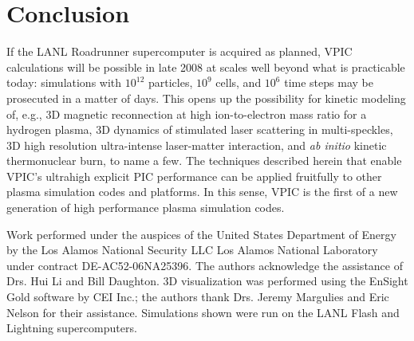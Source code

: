 \documentclass[aps,prl,preprint,preprintnumbers,groupedaddress]{revtex4}
\begin{document}
\section{Conclusion}

If the LANL Roadrunner supercomputer is acquired as planned, VPIC
calculations will be possible in late 2008 at scales well beyond what
is practicable today: simulations with $10^{12}$ particles, $10^9$
cells, and $10^6$ time steps may be prosecuted in a matter of days.
This opens up the possibility for kinetic modeling of, e.g., 3D
magnetic reconnection at high ion-to-electron mass ratio for a
hydrogen plasma, 3D dynamics of stimulated laser scattering in
multi-speckles, 3D high resolution ultra-intense laser-matter
interaction, and \textit{ab initio} kinetic thermonuclear burn, to
name a few.  The techniques described herein that enable VPIC's
ultrahigh explicit PIC performance can be applied fruitfully to other
plasma simulation codes and platforms.  In this sense, VPIC is the
first of a new generation of high performance plasma simulation codes.

\begin{acknowledgments}
Work performed under the auspices of the United States Department of
Energy by the Los Alamos National Security LLC Los Alamos National
Laboratory under contract DE-AC52-06NA25396.  The authors acknowledge
the assistance of Drs. Hui Li and Bill Daughton.  3D visualization was
performed using the EnSight Gold software by CEI Inc.; the authors
thank Drs. Jeremy Margulies and Eric Nelson for their assistance.
Simulations shown were run on the LANL Flash and Lightning
supercomputers.
\end{acknowledgments}

  
\end{document}
